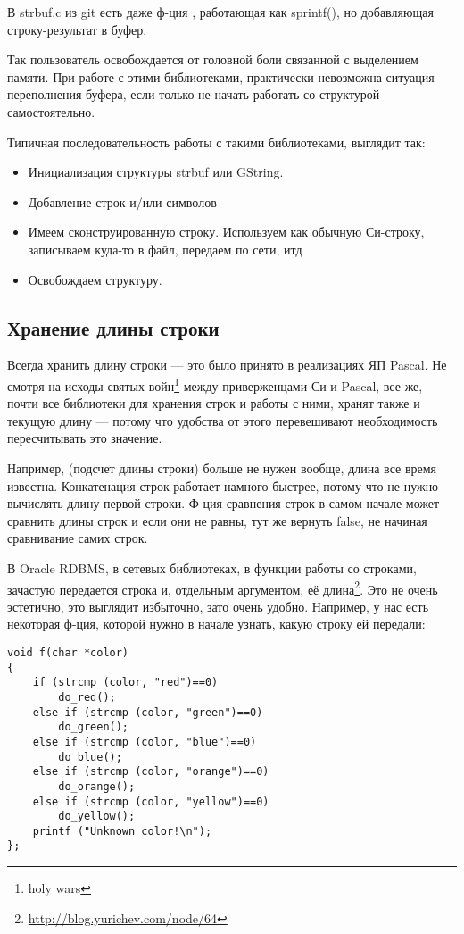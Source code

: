 В strbuf.c из git есть даже ф-ция , работающая как sprintf(), 
но добавляющая строку-результат в буфер.

Так пользователь освобождается от головной боли связанной с выделением памяти.
При работе с этими библиотеками, практически невозможна ситуация переполнения буфера, если только не начать
работать со структурой самостоятельно.

Типичная последовательность работы с такими библиотеками, выглядит так:

\begin{itemize}
\item
Инициализация структуры strbuf или GString.

\item
Добавление строк и/или символов

\item
Имеем сконструированную строку. Используем как обычную Си-строку, записываем куда-то в файл, передаем по сети, итд

\item
Освобождаем структуру.
\end{itemize}

\subsection{Хранение длины строки}

Всегда хранить длину строки --- это было принято в реализациях ЯП Pascal. 
Не смотря на исходы святых войн\footnote{holy wars} между приверженцами Си и Pascal, все же, почти все библиотеки
для хранения строк и работы с ними, хранят также и текущую длину --- потому что удобства от этого перевешивают
необходимость пересчитывать это значение.

Например,  (подсчет длины строки) больше не нужен вообще, длина все время известна.
Конкатенация строк работает намного быстрее, потому что не нужно вычислять длину первой строки.
Ф-ция сравнения строк в самом начале может сравнить длины строк и если они не равны, тут же вернуть false,
не начиная сравнивание самих строк.

В Oracle RDBMS, в сетевых библиотеках, в функции работы со строками, зачастую передается строка и, 
отдельным аргументом, её длина\footnote{\url{http://blog.yurichev.com/node/64}}.
Это не очень эстетично, это выглядит избыточно, зато очень удобно.
Например, у нас есть некоторая ф-ция, которой нужно в начале узнать, какую строку ей передали:

\begin{lstlisting}
void f(char *color)
{
	if (strcmp (color, "red")==0)
		do_red();
	else if (strcmp (color, "green")==0)
		do_green();
	else if (strcmp (color, "blue")==0)
		do_blue();
	else if (strcmp (color, "orange")==0)
		do_orange();
	else if (strcmp (color, "yellow")==0)
		do_yellow();
	printf ("Unknown color!\n");
};
\end{lstlisting}

